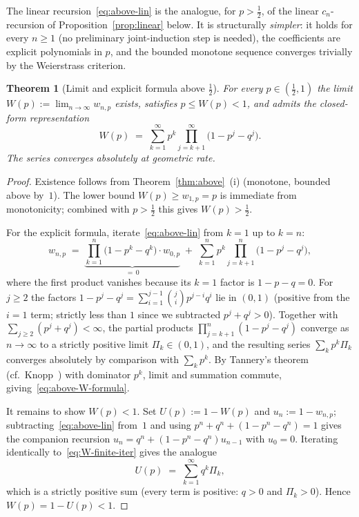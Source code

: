 \documentclass[12pt]{article}
\newtheorem{theorem}{Theorem}[section]
\theoremstyle{definition}
\theoremstyle{remark}
\begin{document}
The linear recursion~\eqref{eq:above-lin} is the analogue, for
$p>\tfrac12$, of the linear $c_n$-recursion of
Proposition~\ref{prop:linear} below.  It is structurally
\emph{simpler}: it holds for every $n\ge 1$ (no preliminary
joint-induction step is needed), the coefficients are explicit
polynomials in $p$, and the bounded monotone sequence converges
trivially by the Weierstrass criterion.

\begin{theorem}[Limit and explicit formula above $\tfrac12$]
  \label{thm:above-limit}
  For every $p\in(\tfrac12,1)$ the limit
  $W(p):=\lim_{n\to\infty}w_{n,p}$ exists, satisfies
  $p\le W(p)<1$, and admits the closed-form representation
  \begin{equation}\label{eq:above-W-formula}
    W(p) \;=\; \sum_{k=1}^\infty p^k\!\!\!\prod_{j=k+1}^\infty\!\!
            \bigl(1-p^j-q^j\bigr).
  \end{equation}
  The series converges absolutely at geometric rate.
\end{theorem}

\begin{proof}
  Existence follows from Theorem~\ref{thm:above}~(i) (monotone,
  bounded above by~$1$).  The lower bound $W(p)\ge w_{1,p}=p$ is
  immediate from monotonicity; combined with $p>\tfrac12$ this
  gives $W(p)>\tfrac12$.

  For the explicit formula, iterate~\eqref{eq:above-lin} from
  $k=1$ up to $k=n$:
  \begin{equation}\label{eq:W-finite-iter}
    w_{n,p} \;=\; \underbrace{\prod_{k=1}^n\!\bigl(1-p^k-q^k\bigr)
                               \cdot w_{0,p}}_{=\,0}
    \;+\; \sum_{k=1}^n p^k\!\prod_{j=k+1}^n\!\bigl(1-p^j-q^j\bigr),
  \end{equation}
  where the first product vanishes because its $k=1$ factor is
  $1-p-q=0$.  For $j\ge 2$ the factors
  $1-p^j-q^j=\sum_{i=1}^{j-1}\binom{j}{i}p^{j-i}q^i$ lie in $(0,1)$
  (positive from the $i=1$ term; strictly less than $1$ since we
  subtracted $p^j+q^j>0$).  Together with
  $\sum_{j\ge 2}(p^j+q^j)<\infty$, the partial products
  $\prod_{j=k+1}^n(1-p^j-q^j)$ converge as $n\to\infty$ to a
  strictly positive limit $\Pi_k\in(0,1)$, and the resulting
  series $\sum_k p^k\Pi_k$ converges absolutely by comparison with
  $\sum_k p^k$.  By Tannery's theorem
  (cf.~Knopp~\cite[\S 41]{Knopp1990}) with dominator $p^k$, limit
  and summation commute, giving~\eqref{eq:above-W-formula}.

  It remains to show $W(p)<1$.  Set $U(p):=1-W(p)$ and
  $u_n:=1-w_{n,p}$; subtracting~\eqref{eq:above-lin} from~$1$ and
  using $p^n+q^n+(1-p^n-q^n)=1$ gives the companion recursion
  $u_n=q^n+(1-p^n-q^n)u_{n-1}$ with $u_0=0$.
  Iterating identically to~\eqref{eq:W-finite-iter} gives the
  analogue
  \[
    U(p) \;=\; \sum_{k=1}^\infty q^k\Pi_k,
  \]
  which is a strictly positive sum (every term is positive: $q>0$
  and $\Pi_k>0$).  Hence $W(p)=1-U(p)<1$.
\end{proof}
\end{document}
